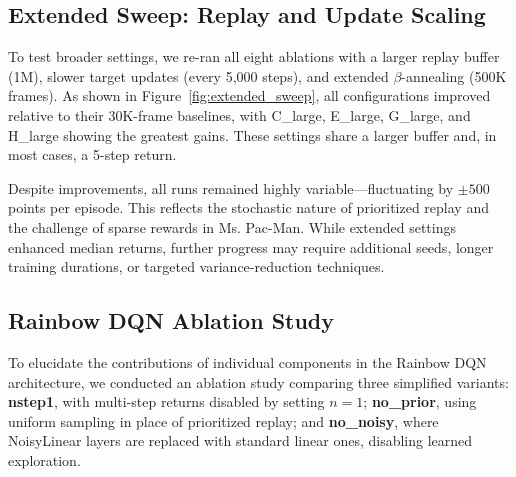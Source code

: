 \documentclass{article}
\begin{document}
\subsection{Extended Sweep: Replay and Update Scaling}

To test broader settings, we re-ran all eight ablations with a larger replay buffer (1M), slower target updates (every 5,000 steps), and extended \(\beta\)-annealing (500K frames). As shown in Figure~\ref{fig:extended_sweep}, all configurations improved relative to their 30K-frame baselines, with C\_large, E\_large, G\_large, and H\_large showing the greatest gains. These settings share a larger buffer and, in most cases, a 5-step return.

Despite improvements, all runs remained highly variable—fluctuating by \(\pm500\) points per episode. This reflects the stochastic nature of prioritized replay and the challenge of sparse rewards in Ms. Pac-Man. While extended settings enhanced median returns, further progress may require additional seeds, longer training durations, or targeted variance-reduction techniques.





\subsection{Rainbow DQN Ablation Study}

To elucidate the contributions of individual components in the Rainbow DQN architecture, we conducted an ablation study comparing three simplified variants: \textbf{nstep1}, with multi-step returns disabled by setting $n=1$; \textbf{no\_prior}, using uniform sampling in place of prioritized replay; and \textbf{no\_noisy}, where NoisyLinear layers are replaced with standard linear ones, disabling learned exploration.
\end{document}
